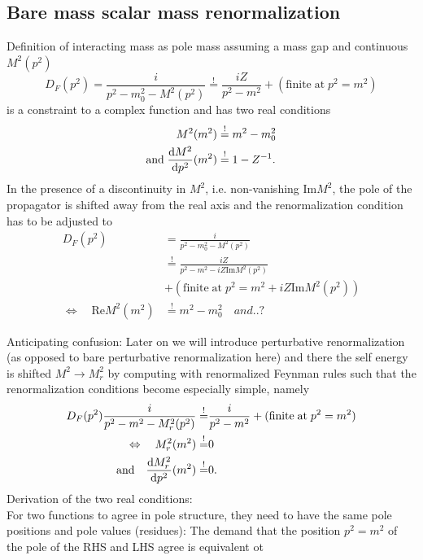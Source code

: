 \subsection{Bare mass scalar mass renormalization}
\begin{mybox}{}
	Definition of interacting mass as pole mass assuming a mass gap and continuous $M^2(p^2)$
	\begin{equation}
	D_F(p^2) = \frac{i}{p^2-m^2_0-M^2(p^2)} \stackrel{!}{=} \frac{iZ}{p^2-m^2} + (\mathrm{finite\;at}\;p^2=m^2)
	\end{equation}
	is a constraint to a complex function and has two real conditions
	\begin{align}
		M^2(m^2)&\stackrel{!}{=} m^2-m^2_0\\
		\mathrm{and}\; \frac{\mathrm{d} M^2}{\mathrm{d} p^2}(m^2) &\stackrel{!}{=} 1 - Z^{-1}.
	\end{align}
	In the presence of a discontinuity in $M^2$, i.e. non-vanishing Im$M^2$, the pole of the propagator is shifted away from the real axis and the renormalization condition has to be adjusted to
	\begin{align}
		D_F(p^2) &= \frac{i}{p^2-m^2_0-M^2(p^2)} \\
		&\stackrel{!}{=} \frac{iZ}{p^2-m^2-iZ\mathrm{Im}M^2(p^2)} \\
		&+ (\mathrm{finite\;at\;} p^2=m^2 + iZ\mathrm{Im}M^2(p^2))\\
		\Leftrightarrow\quad \mathrm{Re}M^2(m^2) &\stackrel{!}{=} m^2-m^2_0 \quad and ..?
	\end{align}
\end{mybox}
Anticipating confusion: Later on we will introduce perturbative renormalization (as opposed to bare perturbative renormalization here) and there the self energy is shifted $M^2\rightarrow M^2_r$ by computing with renormalized Feynman rules such that the renormalization conditions become especially simple, namely
\begin{align}
	D_F(p^2) \frac{i}{p^2-m^2-M^2_r(p^2)} \stackrel{!}{=}&\frac{i}{p^2-m^2} + (\mathrm{finite\;at\;} p^2=m^2) \\
	\Leftrightarrow\quad M^2_r(m^2) \stackrel{!}{=} & 0 \\
	\mathrm{and}\quad \frac{\mathrm{d} M^2_r}{\mathrm{d} p^2}(m^2) \stackrel{!}{=}&0.
\end{align}
Derivation of the two real conditions:\\
For two functions to agree in pole structure, they need to have the same pole positions and pole values (residues): The demand that the position $p^2=m^2$ of the pole of the RHS and LHS agree is equivalent ot
